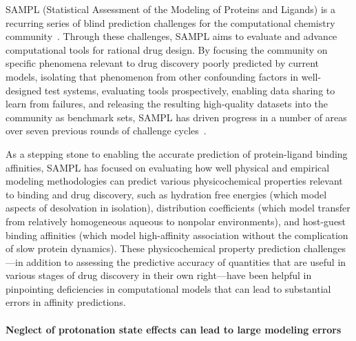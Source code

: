 \documentclass[9pt,lineno]{elife}
\newcommand{\pKa}{p\textit{K}\textsubscript{a}}
\begin{document}
SAMPL (Statistical Assessment of the Modeling of Proteins and Ligands) is a recurring series of blind prediction challenges for the computational chemistry community~\citep{mobley_advancing_2016, sample_D3R_website}. 
Through these challenges, SAMPL aims to evaluate and advance computational tools for rational drug design. 
By focusing the community on specific phenomena relevant to drug discovery poorly predicted by current models, isolating that phenomenon from other confounding factors in well-designed test systems, evaluating tools prospectively, enabling data sharing to learn from failures, and releasing the resulting high-quality datasets into the community as benchmark sets, SAMPL has driven progress in a number of areas over seven previous rounds of challenge cycles~\cite{nicholls_predicting_2008,guthrie_blind_2009,skillman_sampl2_2010,geballe_sampl2_2010,skillman_sampl3_2012,skillman_sampl3_2012,geballe_sampl3_2012,muddana_sampl3_2012,guthrie_sampl4_2014,Mobley:2014:JComputAidedMolDesa,muddana_sampl4_2014,mobley_blind_2014,yin_overview_2016,Bannan:2016:JComputAidedMolDes}.

As a stepping stone to enabling the accurate prediction of protein-ligand binding affinities, SAMPL has focused on evaluating how well physical and empirical modeling methodologies can predict various physicochemical properties relevant to binding and drug discovery, such as hydration free energies (which model aspects of desolvation in isolation), distribution coefficients (which model transfer from relatively homogeneous aqueous to nonpolar environments), and host-guest binding affinities (which model high-affinity association without the complication of slow protein dynamics).
These physicochemical property prediction challenges---in addition to assessing the predictive accuracy of quantities that are useful in various stages of drug discovery in their own right---have been helpful in pinpointing deficiencies in computational models that can lead to substantial errors in affinity predictions. 

\paragraph{Neglect of protonation state effects can lead to large modeling errors}
\end{document}
